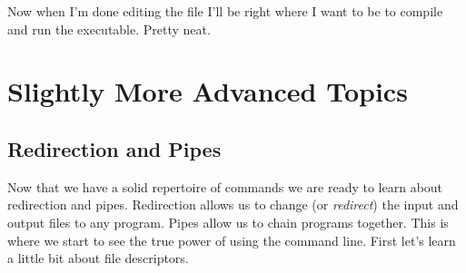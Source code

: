 \documentclass[oneside]{book}
\newcommand{\commandline}[1]{\begin{center} \colorbox{Dark}{\textcolor{white}{#1}} \end{center}}
\begin{document}
Now when I'm done editing the file I'll be right where I want to be to compile and run the executable. Pretty neat.


    
    
    



\newpage

\chapter{Slightly More Advanced Topics}

\section{Redirection and Pipes}
    Now that we have a solid repertoire of commands we are ready to learn about redirection and pipes. Redirection allows us to change (or \textit{redirect}) the input and output files to any program. Pipes allow us to chain programs together. This is where we start to see the true power of using the command line. First let's learn a little bit about file descriptors. 
    
\end{document}
